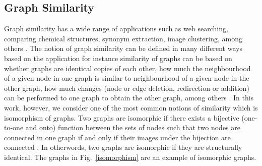 \documentclass[10pt,a4paper]{article}
\begin{document}
     \subsection{Graph Similarity}
     Graph similarity has a wide range of applications such as web searching, comparing chemical structures, synonym extraction, image clustering, among others \citep{zager2008graph, nikolic2012measuring}. 
     The notion of graph similarity can be defined in many different ways based on the application for instance similarity of graphs can be based on whether graphs are identical copies of each other, how much the neighbourhood of a given node in one graph is similar to neighbourhood of a given node in the other graph, how much changes (node or edge deletion, redirection or addition) can be performed to one graph to obtain the other graph, among others \citep{zager2008graph}. In this work, however, we consider one of the most common notions of similarity which is isomorphism of graphs.
     Two graphs are isomorphic if there exists a bijective (one-to-one and onto) function between the sets of nodes
     such that two nodes are connected in one graph if and only if their images under the bijection are connected \citep{zager2008graph}. In otherwords, two graphs are isomorphic if they are structurally identical. The graphs in Fig.~\ref{isomorphism} are an example of isomorphic graphs.
     
\end{document}
